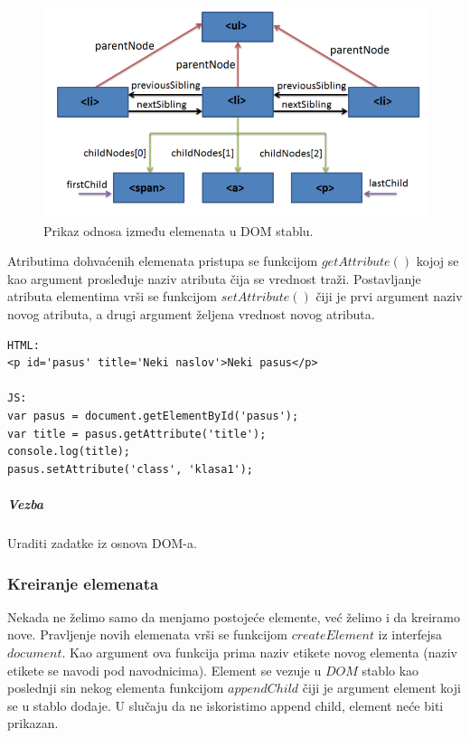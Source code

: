 \documentclass[a4paper]{article}
\begin{document}
\begin{figure}[h!]
\begin{center}
\includegraphics[scale=0.5]{pictures/parentchild.png}
\end{center}
\caption{Prikaz odnosa između elemenata u DOM stablu.}
\label{fig:dom2}
\end{figure}	
Atributima dohvaćenih elemenata pristupa se funkcijom $getAttribute()$ kojoj se kao argument prosleđuje naziv atributa čija se vrednost traži. Postavljanje atributa elementima vrši se funkcijom $setAttribute()$ čiji je prvi argument naziv novog atributa, a drugi argument željena vrednost novog atributa.
\begin{lstlisting}[backgroundcolor = \color{lightgray}]
HTML:
<p id='pasus' title='Neki naslov'>Neki pasus</p>

JS:
var pasus = document.getElementById('pasus');
var title = pasus.getAttribute('title');
console.log(title);
pasus.setAttribute('class', 'klasa1');
\end{lstlisting}

\subparagraph{Vezba} Uraditi zadatke iz osnova DOM-a.

\subsubsection{Kreiranje elemenata}
Nekada ne želimo samo da menjamo postojeće elemente, već želimo i da kreiramo nove. Pravljenje novih elemenata vrši se funkcijom $createElement$ iz interfejsa $document$. Kao argument ova funkcija prima naziv etikete novog elementa (naziv etikete se navodi pod navodnicima). Element se vezuje u $DOM$ stablo kao poslednji sin nekog elementa funkcijom $appendChild$ čiji je argument element koji se u stablo dodaje. U slučaju da ne iskoristimo append child, element neće biti prikazan.
\end{document}

